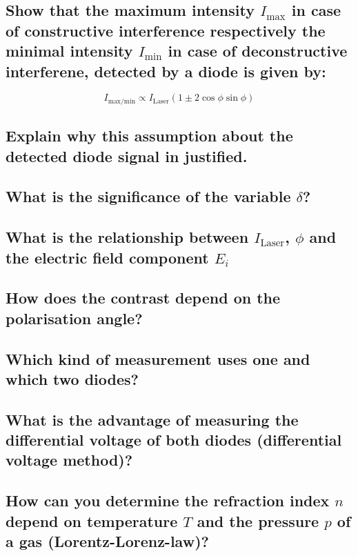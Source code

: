 \subsection*{Show that the maximum intensity $I_\text{max}$ in case of constructive interference respectively the minimal intensity $I_\text{min}$ in case of deconstructive interferene, detected by a diode is given by:}
\begin{equation*}
    I_\text{max/min}\propto I_\text{Laser}(1\pm2\cos\phi\sin\phi)
\end{equation*}
\subsection*{Explain why this assumption about the detected diode signal in justified.}
\subsection*{What is the significance of the variable $\delta$?}
\subsection*{What is the relationship between $I_\text{Laser}$, $\phi$ and the electric field component $E_i$}

\subsection*{How does the contrast depend on the polarisation angle?}

\subsection*{Which kind of measurement uses one and which  two diodes?}
\subsection*{What is the advantage of measuring the differential voltage of both diodes (differential voltage method)?}

\subsection*{How can you determine the refraction index $n$ depend on temperature $T$ and the pressure $p$ of a gas (Lorentz-Lorenz-law)?}
